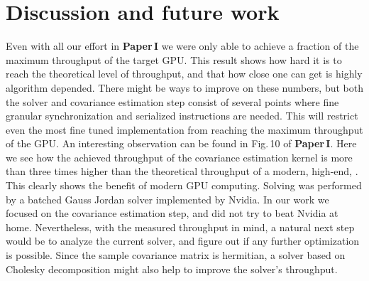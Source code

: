 \section{Discussion and future work}
Even with all our effort in \textbf{Paper\,I} we were only able to achieve a fraction of the maximum throughput of the target GPU. This result shows how hard it is to reach the theoretical level of throughput, and that how close one can get is highly algorithm depended. There might be ways to improve on these numbers, but both the solver and covariance estimation step consist of several points where fine granular synchronization and serialized instructions are needed. This will restrict even the most fine tuned implementation from reaching the maximum throughput of the GPU. An interesting observation can be found in Fig.\,10 of \textbf{Paper\,I}. Here we see how the achieved throughput of the covariance estimation kernel is more than three times higher than the theoretical throughput of a modern, high-end, . This clearly shows the benefit of modern GPU computing.  Solving was performed by a batched Gauss Jordan solver implemented by Nvidia. In our work we focused on the covariance estimation step, and did not try to beat Nvidia at home. Nevertheless, with the measured throughput in mind, a natural next step would be to analyze the current solver, and figure out if any further optimization is possible. Since the sample covariance matrix is hermitian, a solver based on Cholesky decomposition might also help to improve the solver's throughput.
\\\\
